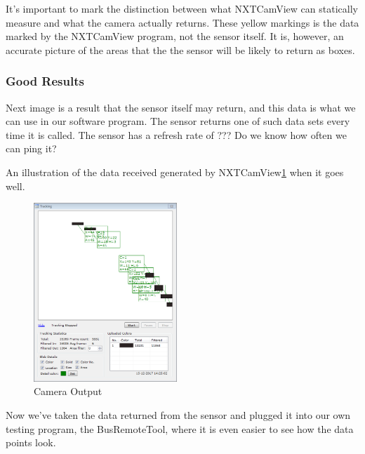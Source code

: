 It's important to mark the distinction between what NXTCamView can statically measure and what the camera actually returns. These yellow markings is the data marked by the NXTCamView program, not the sensor itself. It is, however, an accurate picture of the areas that the the sensor will be likely to return as boxes. 

\subsubsection{Good Results}

Next image is a result that the sensor itself may return, and this data is what we can use in our software program. The sensor returns one of such data sets every time it is called. 
The sensor has a refresh rate of ???
Do we know how often we can ping it?

An illustration of the data received generated by NXTCamView\ref{fig:CamOutput1} when it goes well.
\begin{figure}[H]
    \centering
    \includegraphics[width=0.48\textwidth]{Images/Analysis/NXTCamTesting/NXTCamView_Boxes_1.png}
    \caption{Camera Output}
    \label{fig:CamOutput1}
\end{figure}

Now we've taken the data returned from the sensor and plugged it into our own testing program, the BusRemoteTool, where it is even easier to see how the data points look.


